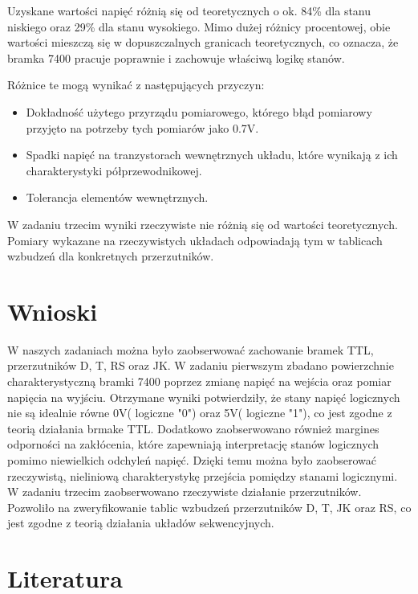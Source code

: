 \documentclass{article}
\begin{document}
Uzyskane wartości napięć różnią się od teoretycznych o ok. 84\% dla stanu niskiego oraz 29\% dla stanu wysokiego.
Mimo dużej różnicy procentowej, obie wartości mieszczą się w dopuszczalnych granicach teoretycznych, co oznacza, że bramka 7400 pracuje poprawnie i zachowuje właściwą logikę stanów.\linebreak

Różnice te mogą wynikać z następujących przyczyn:

\begin{itemize}
	\item Dokładność użytego przyrządu pomiarowego, którego błąd pomiarowy przyjęto na potrzeby tych pomiarów jako 0.7V.
	\item Spadki napięć na tranzystorach wewnętrznych układu, które wynikają z ich charakterystyki półprzewodnikowej.
	\item Tolerancja elementów wewnętrznych.
\end{itemize}

W zadaniu trzecim wyniki rzeczywiste nie różnią się od wartości teoretycznych. Pomiary wykazane na rzeczywistych układach odpowiadają tym w tablicach wzbudzeń dla konkretnych przerzutników.

\section{Wnioski}
W naszych zadaniach można było zaobserwować zachowanie bramek TTL, przerzutników D, T, RS oraz JK. W zadaniu pierwszym zbadano powierzchnie charakterystyczną bramki 7400 poprzez zmianę napięć na wejścia oraz pomiar napięcia na wyjściu. Otrzymane wyniki potwierdziły, że stany napięć logicznych nie są idealnie równe 0V( logiczne "0") oraz 5V( logiczne "1"), co jest zgodne z teorią działania brmake TTL. Dodatkowo zaobserwowano również margines odporności na zakłócenia, które zapewniają interpretację stanów logicznych pomimo niewielkich odchyleń napięć. Dzięki temu można było zaobserować rzeczywistą, nieliniową charakterystykę przejścia pomiędzy stanami logicznymi.\\

W zadaniu trzecim zaobserwowano rzeczywiste działanie przerzutników. Pozwoliło na zweryfikowanie tablic wzbudzeń przerzutników D, T, JK oraz RS, co jest zgodne z teorią działania układów sekwencyjnych.
\pagebreak
\section{Literatura}
\end{document}
